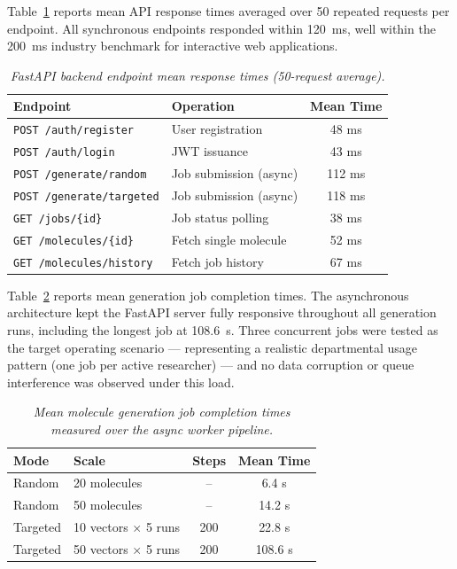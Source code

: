 \documentclass[12pt,a4paper]{report}
\begin{document}
Table~\ref{tab:api_performance} reports mean API response times averaged over 50 repeated requests per endpoint. All synchronous endpoints responded within 120~ms, well within the 200~ms industry benchmark for interactive web applications.

\begin{table}[htbp]
\centering
\caption{\textit{FastAPI backend endpoint mean response times (50-request average).}}
\label{tab:api_performance}
\begin{tabular}{p{5.0cm}p{4.5cm}c}
\hline
\textbf{Endpoint} & \textbf{Operation} & \textbf{Mean Time} \\
\hline
\texttt{POST /auth/register}     & User registration      & 48 ms  \\
\texttt{POST /auth/login}        & JWT issuance           & 43 ms  \\
\texttt{POST /generate/random}   & Job submission (async) & 112 ms \\
\texttt{POST /generate/targeted} & Job submission (async) & 118 ms \\
\texttt{GET  /jobs/\{id\}}       & Job status polling     & 38 ms  \\
\texttt{GET  /molecules/\{id\}}  & Fetch single molecule  & 52 ms  \\
\texttt{GET  /molecules/history} & Fetch job history      & 67 ms  \\
\hline
\end{tabular}
\end{table}

Table~\ref{tab:job_times} reports mean generation job completion times. The asynchronous architecture kept the FastAPI server fully responsive throughout all generation runs, including the longest job at 108.6~s. Three concurrent jobs were tested as the target operating scenario — representing a realistic departmental usage pattern (one job per active researcher) — and no data corruption or queue interference was observed under this load.

\begin{table}[htbp]
\centering
\caption{\textit{Mean molecule generation job completion times measured over the async worker pipeline.}}
\label{tab:job_times}
\begin{tabular}{p{3.5cm}p{3.5cm}cc}
\hline
\textbf{Mode} & \textbf{Scale} & \textbf{Steps} & \textbf{Mean Time} \\
\hline
Random     & 20 molecules               & --  & 6.4 s   \\
Random     & 50 molecules               & --  & 14.2 s  \\
Targeted   & 10 vectors $\times$ 5 runs & 200 & 22.8 s  \\
Targeted   & 50 vectors $\times$ 5 runs & 200 & 108.6 s \\
\hline
\end{tabular}
\end{table}
\end{document}
